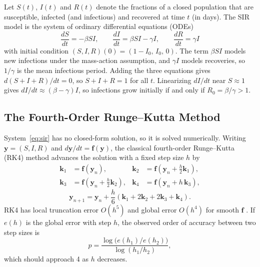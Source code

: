 \documentclass[12pt,a4paper]{article}
\newcommand{\Rzero}{R_0}
\begin{document}
Let $S(t)$, $I(t)$ and $R(t)$ denote the fractions of a closed population that are susceptible, infected (and infectious) and recovered at time $t$ (in days). The SIR model is the system of ordinary differential equations (ODEs)
\begin{equation}
  \frac{dS}{dt} = -\beta S I, \qquad
  \frac{dI}{dt} = \beta S I - \gamma I, \qquad
  \frac{dR}{dt} = \gamma I
  \label{eq:sir}
\end{equation}
with initial condition $(S,I,R)(0) = (1-I_0,\, I_0,\, 0)$. The term $\beta S I$ models new infections under the mass-action assumption, and $\gamma I$ models recoveries, so $1/\gamma$ is the mean infectious period. Adding the three equations gives $d(S+I+R)/dt = 0$, so $S+I+R=1$ for all $t$. Linearizing $dI/dt$ near $S\approx 1$ gives $dI/dt \approx (\beta-\gamma)I$, so infections grow initially if and only if $\Rzero=\beta/\gamma>1$.

\subsection{The Fourth-Order Runge--Kutta Method}

System~\eqref{eq:sir} has no closed-form solution, so it is solved numerically. Writing $\mathbf{y}=(S,I,R)$ and $d\mathbf{y}/dt = \mathbf{f}(\mathbf{y})$, the classical fourth-order Runge--Kutta (RK4) method advances the solution with a fixed step size $h$ by
\begin{equation}
\begin{aligned}
  \mathbf{k}_1 &= \mathbf{f}(\mathbf{y}_n), &
  \mathbf{k}_2 &= \mathbf{f}\!\left(\mathbf{y}_n + \tfrac{h}{2}\mathbf{k}_1\right),\\
  \mathbf{k}_3 &= \mathbf{f}\!\left(\mathbf{y}_n + \tfrac{h}{2}\mathbf{k}_2\right), &
  \mathbf{k}_4 &= \mathbf{f}\!\left(\mathbf{y}_n + h\,\mathbf{k}_3\right),
\end{aligned}
\label{eq:rk4k}
\end{equation}
\begin{equation}
  \mathbf{y}_{n+1} = \mathbf{y}_n + \frac{h}{6}\left(\mathbf{k}_1 + 2\mathbf{k}_2 + 2\mathbf{k}_3 + \mathbf{k}_4\right).
  \label{eq:rk4y}
\end{equation}
RK4 has local truncation error $O(h^5)$ and global error $O(h^4)$ for smooth $\mathbf{f}$ \citep{burden2011}. If $e(h)$ is the global error with step $h$, the observed order of accuracy between two step sizes is
\begin{equation}
  p = \frac{\log\bigl(e(h_1)/e(h_2)\bigr)}{\log(h_1/h_2)},
  \label{eq:order}
\end{equation}
which should approach 4 as $h$ decreases.
\end{document}
